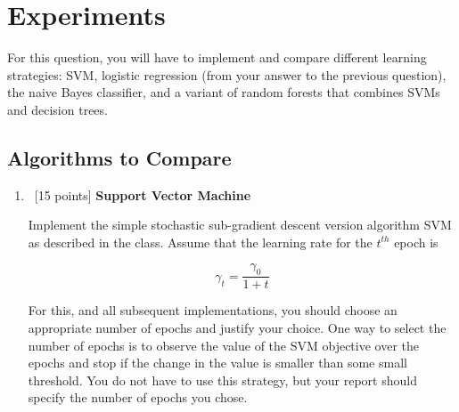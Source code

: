 \section{Experiments}\label{sec:q2}

For this question, you will have to implement and compare different
learning strategies: SVM, logistic regression (from your answer to
the previous question), the naive Bayes classifier, and a variant of
random forests that combines SVMs and decision trees.


\subsection{Algorithms to Compare}

\begin{enumerate}
\item~[15 points] \textbf{Support Vector Machine}

  Implement the simple stochastic sub-gradient descent version
  algorithm SVM as described in the class. Assume that the learning
  rate for the $t^{th}$ epoch is

  $$\gamma_t = \frac{\gamma_0}{1 + t}$$

  For this, and all subsequent implementations, you should choose an
  appropriate number of epochs and justify your choice. One way to
  select the number of epochs is to observe the value of the SVM
  objective over the epochs and stop if the change in the value is
  smaller than some small threshold. You do not have to use this
  strategy, but your report should specify the number of epochs you
  chose.


\end{enumerate}
